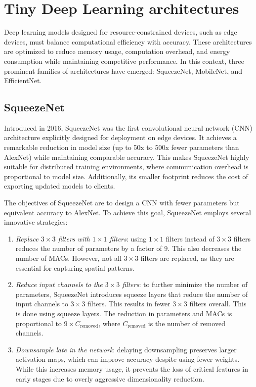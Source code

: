 \section{Tiny Deep Learning architectures}

Deep learning models designed for resource-constrained devices, such as edge devices, must balance computational efficiency with accuracy.
These architectures are optimized to reduce memory usage, computation overhead, and energy consumption while maintaining competitive performance.
In this context, three prominent families of architectures have emerged: SqueezeNet, MobileNet, and EfficientNet.

\subsection{SqueezeNet}
Introduced in 2016, SqueezeNet was the first convolutional neural network (CNN) architecture explicitly designed for deployment on edge devices.
It achieves a remarkable reduction in model size (up to 50x to 500x fewer parameters than AlexNet) while maintaining comparable accuracy.
This makes SqueezeNet highly suitable for distributed training environments, where communication overhead is proportional to model size.
Additionally, its smaller footprint reduces the cost of exporting updated models to clients.

The objectives of SqueezeNet are to design a CNN with fewer parameters but equivalent accuracy to AlexNet.
To achieve this goal, SqueezeNet employs several innovative strategies:
\begin{enumerate}
    \item \textit{Replace $3\times 3$ filters with $1\times 1$ filters}: using $1\times 1$ filters instead of $3\times 3$ filters reduces the number of parameters by a factor of 9. 
        This also decreases the number of MACs. 
        However, not all $3\times 3$ filters are replaced, as they are essential for capturing spatial patterns.
    \item \textit{Reduce input channels to the $3\times 3$ filters}: to further minimize the number of parameters, SqueezeNet introduces squeeze layers that reduce the number of input channels to $3\times 3$ filters. 
        This results in fewer $3\times 3$ filters overall. 
        This is done using squeeze layers. 
        The reduction in parameters and MACs is proportional to $9\times C_{\text{removed}}$, where $C_{\text{removed}}$ is the number of removed channels.
    \item \textit{Downsample late in the network}: delaying downsampling preserves larger activation maps, which can improve accuracy despite using fewer weights.
        While this increases memory usage, it prevents the loss of critical features in early stages due to overly aggressive dimensionality reduction.
\end{enumerate}

